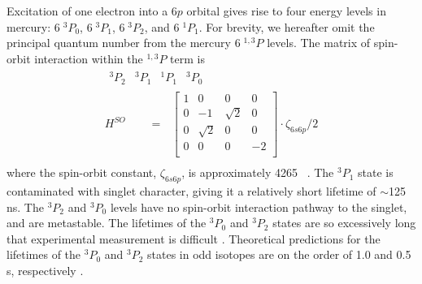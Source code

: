 Excitation of one electron into a $6p$ orbital gives rise to four
energy levels in mercury: $6 \; ^3P_0$, $6 \; ^3P_1$, $6 \; ^3P_2$,
and $6 \; ^1P_1$.  For brevity, we hereafter omit the principal
quantum number from the mercury $6 \; ^{1,3}P$ levels.  The matrix of
spin-orbit interaction within the $^{1,3}P$ term is
\begin{equation}
\begin{split}
 \begin{array}{cccc}^3P_2 & ^3P_1 & ^1P_1 & ^3P_0\end{array}
 \:\:\:\:\:\:\:\:\:\:\:\:\:\:\:\\
H^{SO} \:\:\:\:\:\:\:\:\: = \:\:\:
    \begin{bmatrix}
     1 & 0 & 0 & 0  \\
     0 & -1 & \sqrt{2} & 0 \\   
     0 & \sqrt{2} & 0 & 0 \\ 
     0 & 0 & 0 & -2 \\  
    \end{bmatrix}
  \cdot \zeta_{6s6p}/2\\
\end{split}
\end{equation}
where the spin-orbit constant, $\zeta_{6s6p}$, is approximately 4265
\rcm\ \cite{field04}.  The $^3P_1$ state is contaminated with singlet
character, giving it a relatively short lifetime of $\sim$125 ns.  The
$^3P_2$ and $^3P_0$ levels have no spin-orbit interaction pathway to
the singlet, and are metastable.  The lifetimes of the $^3P_0$ and
$^3P_2$ states are so excessively long that experimental measurement
is difficult \cite{wexler80}.  Theoretical predictions for the
lifetimes of the $^3P_0$ and $^3P_2$ states in odd isotopes are on the
order of 1.0 and 0.5 s, respectively \cite{mishra01}.

